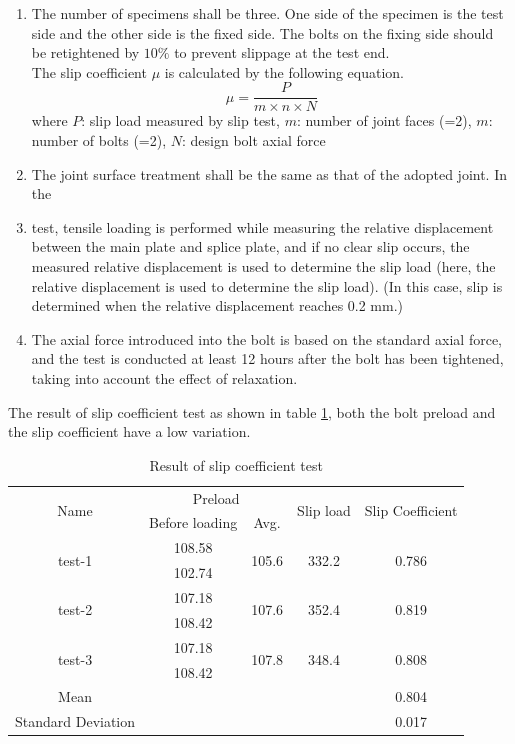 \begin{enumerate}
    \item The number of specimens shall be three. One side of the specimen is the test side and the other side is the fixed side. The bolts on the fixing side should be retightened by $10\%$ to prevent slippage at the test end. \\
    The slip coefficient $\mu$ is calculated by the following equation.
    \begin{equation}
    \mu = \frac{P}{m\times n \times N}
    \end{equation}
    where $P$: slip load measured by slip test, $m$: number of joint faces (=2), $m$: number of bolts (=2), $N$: design bolt axial force
    
    \item The joint surface treatment shall be the same as that of the adopted joint.
    In the 
    \item test, tensile loading is performed while measuring the relative displacement between the main plate and splice plate, and if no clear slip occurs, the measured relative displacement is used to determine the slip load (here, the relative displacement is used to determine the slip load). (In this case, slip is determined when the relative displacement reaches 0.2 mm.)
    \item The axial force introduced into the bolt is based on the standard axial force, and the test is conducted at least 12 hours after the bolt has been tightened, taking into account the effect of relaxation.
\end{enumerate}

The result of slip coefficient test as shown in table \ref{tab-slipcoef}, both the bolt preload and the slip coefficient have a low variation.

\begin{table}[htbp]
\centering
\caption{Result of slip coefficient test}\label{tab-slipcoef}
\begin{tabular}{@{}ccccc@{}}
\toprule
\multirow{2}{*}{Name} & \multicolumn{2}{c}{Preload} & \multirow{2}{*}{Slip load} & \multirow{2}{*}{Slip Coefficient} \\ \cmidrule(lr){2-3}
 & Before loading & Avg. &  &  \\ \midrule
\multirow{2}{*}{test-1} & 108.58 & \multirow{2}{*}{105.6} & \multirow{2}{*}{332.2} & \multirow{2}{*}{0.786} \\
 & 102.74 &  &  &  \\
\multirow{2}{*}{test-2} & 107.18 & \multirow{2}{*}{107.6} & \multirow{2}{*}{352.4} & \multirow{2}{*}{0.819} \\
 & 108.42 &  &  &  \\
\multirow{2}{*}{test-3} & 107.18 & \multirow{2}{*}{107.8} & \multirow{2}{*}{348.4} & \multirow{2}{*}{0.808} \\
 & 108.42 &  &  &  \\
Mean &  &  &  & 0.804 \\
Standard Deviation &  &  &  & 0.017 \\ \bottomrule
\end{tabular}
\end{table}

